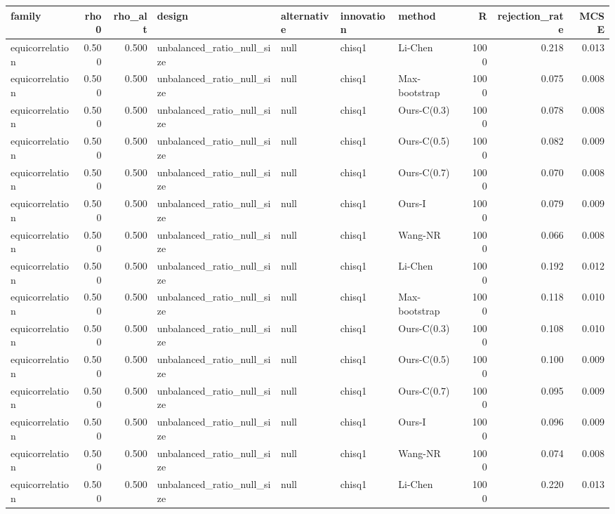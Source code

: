 \begin{tabular}{lrrllllrrr}
\toprule
family & rho0 & rho\_alt & design & alternative & innovation & method & R & rejection\_rate & MCSE \\
\midrule
equicorrelation & 0.500 & 0.500 & unbalanced\_ratio\_null\_size & null & chisq1 & Li-Chen & 1000 & 0.218 & 0.013 \\
equicorrelation & 0.500 & 0.500 & unbalanced\_ratio\_null\_size & null & chisq1 & Max-bootstrap & 1000 & 0.075 & 0.008 \\
equicorrelation & 0.500 & 0.500 & unbalanced\_ratio\_null\_size & null & chisq1 & Ours-C(0.3) & 1000 & 0.078 & 0.008 \\
equicorrelation & 0.500 & 0.500 & unbalanced\_ratio\_null\_size & null & chisq1 & Ours-C(0.5) & 1000 & 0.082 & 0.009 \\
equicorrelation & 0.500 & 0.500 & unbalanced\_ratio\_null\_size & null & chisq1 & Ours-C(0.7) & 1000 & 0.070 & 0.008 \\
equicorrelation & 0.500 & 0.500 & unbalanced\_ratio\_null\_size & null & chisq1 & Ours-I & 1000 & 0.079 & 0.009 \\
equicorrelation & 0.500 & 0.500 & unbalanced\_ratio\_null\_size & null & chisq1 & Wang-NR & 1000 & 0.066 & 0.008 \\
equicorrelation & 0.500 & 0.500 & unbalanced\_ratio\_null\_size & null & chisq1 & Li-Chen & 1000 & 0.192 & 0.012 \\
equicorrelation & 0.500 & 0.500 & unbalanced\_ratio\_null\_size & null & chisq1 & Max-bootstrap & 1000 & 0.118 & 0.010 \\
equicorrelation & 0.500 & 0.500 & unbalanced\_ratio\_null\_size & null & chisq1 & Ours-C(0.3) & 1000 & 0.108 & 0.010 \\
equicorrelation & 0.500 & 0.500 & unbalanced\_ratio\_null\_size & null & chisq1 & Ours-C(0.5) & 1000 & 0.100 & 0.009 \\
equicorrelation & 0.500 & 0.500 & unbalanced\_ratio\_null\_size & null & chisq1 & Ours-C(0.7) & 1000 & 0.095 & 0.009 \\
equicorrelation & 0.500 & 0.500 & unbalanced\_ratio\_null\_size & null & chisq1 & Ours-I & 1000 & 0.096 & 0.009 \\
equicorrelation & 0.500 & 0.500 & unbalanced\_ratio\_null\_size & null & chisq1 & Wang-NR & 1000 & 0.074 & 0.008 \\
equicorrelation & 0.500 & 0.500 & unbalanced\_ratio\_null\_size & null & chisq1 & Li-Chen & 1000 & 0.220 & 0.013 \\

\end{tabular}
